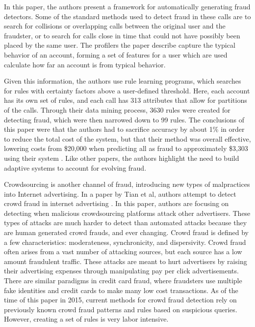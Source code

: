\documentclass[midd]{thesis}
\begin{document}
In this paper, the authors present a framework for automatically generating fraud detectors. Some of the standard methods used to detect fraud in these calls are to search for collisions or overlapping calls between the original user and the fraudster, or to search for calls close in time that could not have possibly been placed by the same user. The profilers the paper describe capture the typical behavior of an account, forming a set of features for a user which are used calculate how far an account is from typical behavior. 

Given this information, the authors use rule learning programs, which searches for rules with certainty factors above a user-defined threshold. Here, each account has its own set of rules, and each call has 313 attributes that allow for partitions of the calls. Through their data mining process, 3630 rules were created for detecting fraud, which were then narrowed down to 99 rules. The conclusions of this paper were that the authors had to sacrifice accuracy by about 1\% in order to reduce the total cost of the system, but that their method was overall effective, lowering costs from \$20,000 when predicting all as fraud to approximately \$3,303 using their system \cite{Fawcett1996}. Like other papers, the authors highlight the need to build adaptive systems to account for evolving fraud.

Crowdsourcing is another channel of fraud, introducing new types of malpractices into Internet advertising. In a paper by Tian et al, authors attempt to detect crowd fraud in internet advertising  \cite{Tian}. In this paper, authors are focusing on detecting when malicious crowdsourcing platforms attack other advertisers. These types of attacks are much harder to detect than automated attacks because they are human generated crowd frauds, and ever changing. Crowd fraud is defined by a few characteristics: moderateness, synchronicity, and dispersivity. Crowd fraud often arises from a vast number of attacking sources, but each source has a low amount fraudulent traffic. These attacks are meant to hurt advertisers by raising their advertising expenses through manipulating pay per click advertisements. There are similar paradigms in credit card fraud, where fraudsters use multiple fake identities and credit cards to make many low cost transactions. As of the time of this paper in 2015, current methods for crowd fraud detection rely on previously known crowd fraud patterns and rules based on suspicious queries. However, creating a set of rules is very labor intensive. 
\end{document}
